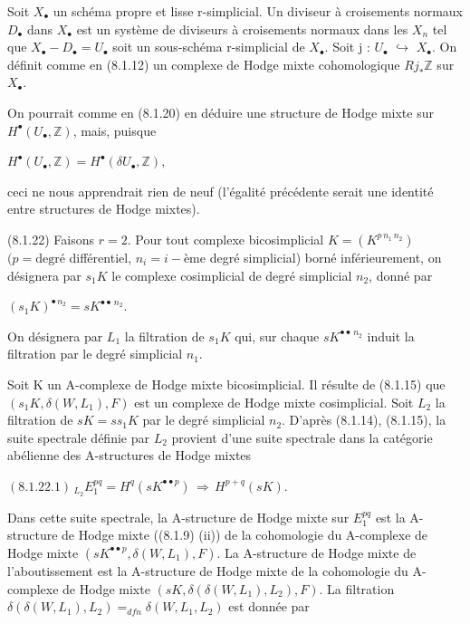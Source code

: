 \documentclass[11pt,twoside]{article}
\newcommand{\DFormula}[1]{%
  \par\smallskip\noindent\hspace*{0pt}\(\displaystyle #1\)\par\smallskip
}
\begin{document}
Soit \(X_{\bullet }\) un schéma propre et lisse r-simplicial. Un diviseur à croisements normaux \(D_{\bullet }\) dans \(X_{\bullet }\) est un système de diviseurs à croisements normaux dans les \(X_{n}\) tel que \(X_{\bullet }−D_{\bullet }=U_{\bullet }\) soit un sous-schéma r-simplicial de \(X_{\bullet }\). Soit j : \(U_{\bullet }\) \(\hookrightarrow \) \(X_{\bullet }\). On définit comme en (8.1.12) un complexe de Hodge mixte cohomologique \(Rj_{\ast }\mathbb{Z}\) sur \(X_{\bullet }\).\par
\par\medskip
On pourrait comme en (8.1.20) en déduire une structure de Hodge mixte sur \(H^{\bullet }(U_{\bullet },\mathbb{Z})\), mais, puisque\par
\par\medskip
\DFormula{H^{\bullet }(U_{\bullet },\mathbb{Z})=H^{\bullet }(\delta U_{\bullet },\mathbb{Z}),}
\par\medskip
ceci ne nous apprendrait rien de neuf (l’égalité précédente serait une identité entre structures de Hodge mixtes).\par
\par\medskip
(8.1.22) Faisons \(r=2\). Pour tout complexe bicosimplicial \(K=(K^{p\,n_{1}\,n_{2}})\) \((p=\text{degré}\) différentiel, \(n_{i}=i-\text{ème}\) degré simplicial) borné inférieurement, on désignera par \(s_{1}K\) le complexe cosimplicial de degré simplicial \(n_{2}\), donné par\par
\par\medskip
\DFormula{(s_{1}K)^{\bullet \,n_{2}}=sK^{\bullet \bullet \,n_{2}}.}
\par\medskip
On désignera par \(L_{1}\) la filtration de \(s_{1}K\) qui, sur chaque \(sK^{\bullet \bullet \,n_{2}}\) induit la filtration par le degré simplicial \(n_{1}\).\par
\par\medskip
Soit K un A-complexe de Hodge mixte bicosimplicial. Il résulte de (8.1.15) que \((s_{1}K,\delta (W,L_{1}),F)\) est un complexe de Hodge mixte cosimplicial. Soit \(L_{2}\) la filtration de \(sK=ss_{1}K\) par le degré simplicial \(n_{2}\). D’après (8.1.14), (8.1.15), la suite spectrale définie par \(L_{2}\) provient d’une suite spectrale dans la catégorie abélienne des A-structures de Hodge mixtes\par
\par\medskip
\DFormula{(8.1.22.1)\,_{L_{2}}E_{1}^{pq}=H^{q}(sK^{\bullet \bullet p})\,\Rightarrow \,H^{p+q}(sK).}
\par\medskip
Dans cette suite spectrale, la A-structure de Hodge mixte sur \(E_{1}^{pq}\) est la A-structure de Hodge mixte ((8.1.9) (ii)) de la cohomologie du A-complexe de Hodge mixte \((sK^{\bullet \bullet p},\delta (W,L_{1}),F)\). La A-structure de Hodge mixte de l’aboutissement est la A-structure de Hodge mixte de la cohomologie du A-complexe de Hodge mixte \((sK,\delta (\delta (W,L_{1}),L_{2}),F)\). La filtration \(\delta (\delta (W,L_{1}),L_{2})=_{dfn}\delta (W,L_{1},L_{2})\) est donnée par\par
\end{document}
